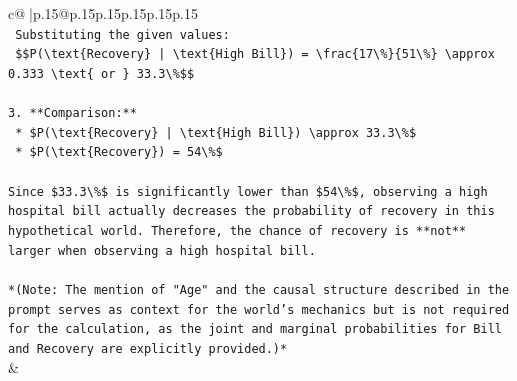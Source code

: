 \documentclass{article}
\begin{document}
{\begin{supertabular}{c@{$\;$}|p{.15\linewidth}@{}p{.15\linewidth}p{.15\linewidth}p{.15\linewidth}p{.15\linewidth}p{.15\linewidth}}
{{{\\ 
\texttt{    Substituting the given values:} \\
\texttt{    \$\$P(\textbackslash{}text\{Recovery\} | \textbackslash{}text\{High Bill\}) = \textbackslash{}frac\{17\textbackslash{}\%\}\{51\textbackslash{}\%\} \textbackslash{}approx 0.333 \textbackslash{}text\{ or \} 33.3\textbackslash{}\%\$\$} \\
\\ 
\texttt{3.  **Comparison:**} \\
\texttt{    *   \$P(\textbackslash{}text\{Recovery\} | \textbackslash{}text\{High Bill\}) \textbackslash{}approx 33.3\textbackslash{}\%\$} \\
\texttt{    *   \$P(\textbackslash{}text\{Recovery\}) = 54\textbackslash{}\%\$} \\
\\ 
\texttt{Since \$33.3\textbackslash{}\%\$ is significantly lower than \$54\textbackslash{}\%\$, observing a high hospital bill actually decreases the probability of recovery in this hypothetical world. Therefore, the chance of recovery is **not** larger when observing a high hospital bill.} \\
\\ 
\texttt{*(Note: The mention of "Age" and the causal structure described in the prompt serves as context for the world's mechanics but is not required for the calculation, as the joint and marginal probabilities for Bill and Recovery are explicitly provided.)*} \\
            }
        }
    }
    & \\ \\


\end{supertabular}}
\end{document}
